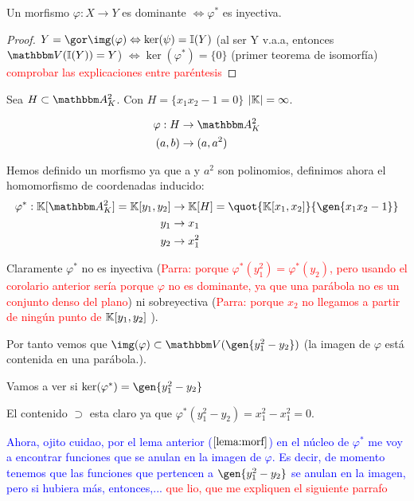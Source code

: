 \begin{corol} \label{cor:morf}
	Un morfismo $\varphi: X \rightarrow Y$ es dominante $\Leftrightarrow \varphi^*$ es inyectiva.
\end{corol}

\begin{proof}
	$Y=\cls{\img(\varphi)} \Leftrightarrow \ker(\psi)=\I(Y)$ (al ser Y v.a.a, entonces $\V(\I(Y))=Y$) $ \Leftrightarrow \ker(\varphi^*)=\{0\}$ (primer teorema de isomorfía) \textcolor{red}{comprobar las explicaciones entre paréntesis}
\end{proof}

\begin{example}
	Sea $H \subset  \A^2_K$. Con $H=\{x_1x_2-1=0\}$ $|\mathbb{K}|=\infty$.

	\begin{align*}
		\varphi: H & \rightarrow \A^2_K \\
		(a,b) & \rightarrow (a,a^2)
	\end{align*}


	Hemos definido un morfismo ya que a y $a^2$ son polinomios, definimos ahora el homomorfismo de coordenadas inducido:
	\begin{align*}
		\varphi^*: \K[\A^2_K]=\K[y_1,y_2] & \rightarrow \K[H]=\quot{\K[x_1,x_2]}{\gen{x_1x_2-1}} \\
		y_1 & \rightarrow x_1 \\
		y_2 & \rightarrow x_1^2
	\end{align*}

	Claramente $\varphi^*$ no es inyectiva (\textcolor{red}{Parra: porque $\varphi^*(y_1^2)=\varphi^*(y_2)$, pero usando el corolario anterior sería porque $\varphi$ no es dominante, ya que una parábola no es un conjunto denso del plano}) ni sobreyectiva (\textcolor{red}{Parra: porque $x_2$ no llegamos a partir de ningún punto de $\mathbb{K}[y_1,y_2]$} ).

    Por tanto vemos que $\img(\varphi) \subset \V(\gen{y_1^2-y_2})$ (la imagen de $\varphi$ está contenida en una parábola.).

    Vamos a ver si $\ker(\varphi^*)=\gen{y_1^2-y_2}$

	El contenido $\supset$ esta claro ya que $\varphi^*(y_1^2-y_2)=x_1^2-x_1^2=0$.

	\textcolor{blue}{Ahora, ojito cuidao, por el lema anterior ($\ref{lema:morf}$) en el núcleo de $\varphi^*$ me voy a encontrar funciones que se anulan en la imagen de $\varphi$. Es decir, de momento tenemos que las funciones que pertencen a $\gen{y_1^2-y_2}$ se anulan en la imagen, pero si hubiera más, entonces,...} \textcolor{red}{que lio, que me expliquen el siguiente parrafo}


\end{example}
